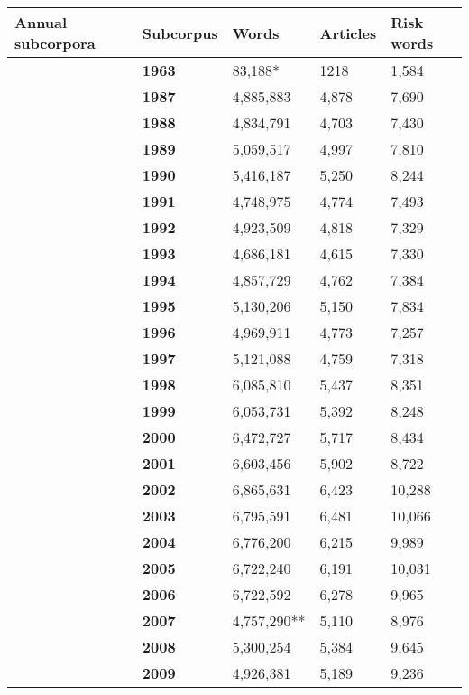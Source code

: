 \begin{table}
\begin{tabular}{p{1.5cm}|l|l|l|l|}
\multicolumn{1}{|p{1.5cm}|}{Annual subcorpora} & \textbf{Subcorpus} & \textbf{Words} & \textbf{Articles} & \textbf{Risk words}   \\ \hline
~ & \textbf{1963} & 83,188* & 1218 &  1,584  \\ \cline{2-5}
~ & \textbf{1987} & 4,885,883 & 4,878 &  7,690  \\ \cline{2-5}
~ & \textbf{1988} & 4,834,791 & 4,703 &  7,430  \\ \cline{2-5}
~ & \textbf{1989} & 5,059,517 & 4,997 &  7,810  \\ \cline{2-5}
~ & \textbf{1990} & 5,416,187 & 5,250 &  8,244  \\ \cline{2-5}
~ & \textbf{1991} & 4,748,975 & 4,774 &  7,493  \\ \cline{2-5}
~ & \textbf{1992} & 4,923,509 & 4,818 &  7,329  \\ \cline{2-5}
~ & \textbf{1993} & 4,686,181 & 4,615 &  7,330  \\ \cline{2-5}
~ & \textbf{1994} & 4,857,729 & 4,762 &  7,384  \\ \cline{2-5}
~ & \textbf{1995} & 5,130,206 & 5,150 &  7,834  \\ \cline{2-5}
~ & \textbf{1996} & 4,969,911 & 4,773 &  7,257  \\ \cline{2-5}
~ & \textbf{1997} & 5,121,088 & 4,759 &  7,318  \\ \cline{2-5}
~ & \textbf{1998} & 6,085,810 & 5,437 &  8,351  \\ \cline{2-5}
~ & \textbf{1999} & 6,053,731 & 5,392 &  8,248  \\ \cline{2-5}
~ & \textbf{2000} & 6,472,727 & 5,717 &  8,434  \\ \cline{2-5}
~ & \textbf{2001} & 6,603,456 & 5,902 &  8,722  \\ \cline{2-5}
~ & \textbf{2002} & 6,865,631 & 6,423 & 10,288  \\ \cline{2-5}
~ & \textbf{2003} & 6,795,591 & 6,481 & 10,066  \\ \cline{2-5}
~ & \textbf{2004} & 6,776,200 & 6,215 &  9,989  \\ \cline{2-5}
~ & \textbf{2005} & 6,722,240 & 6,191 & 10,031  \\ \cline{2-5}
~ & \textbf{2006} & 6,722,592 & 6,278 &  9,965  \\ \cline{2-5}
~ & \textbf{2007} & 4,757,290** & 5,110 &  8,976  \\ \cline{2-5}
~ & \textbf{2008} & 5,300,254 & 5,384 &  9,645  \\ \cline{2-5}
~ & \textbf{2009} & 4,926,381 & 5,189 &  9,236  \\ \cline{2-5}

\end{tabular}
\end{table}
